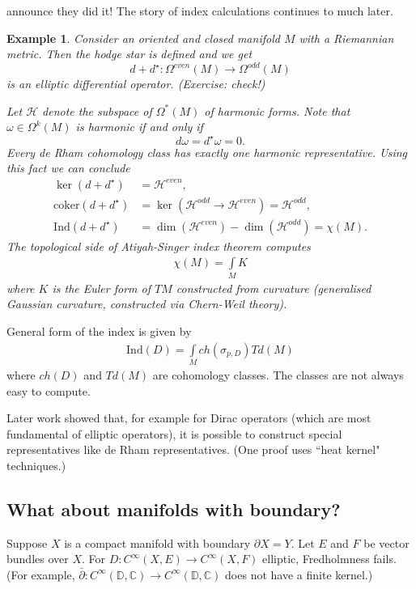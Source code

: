 \documentclass[11pt]{article}
\newcommand{\C}{\mathbb{C}}
\newcommand{\Ind}{\mathrm{Ind}}
\newcommand{\coker}{\mathrm{coker}}
\newtheorem{eg}[thm]{Example}
\begin{document}
 announce they did it! The story of index calculations continues to much later.

\begin{eg}
Consider an oriented and closed manifold $M$ with a Riemannian metric. Then the hodge star is defined and we get
$$ d + d^\star : \Omega^{even}(M) \to \Omega^{odd} (M)$$
is an elliptic differential operator. (Exercise: check!)

Let $\mathcal{H}$ denote the subspace of $\Omega^* (M)$ of harmonic forms. Note that $\omega \in \Omega^k(M)$ is harmonic if and only if $$d\omega = d^\star\omega = 0.$$
 Every de Rham cohomology class has exactly one harmonic representative. 
Using this fact we can conclude
\begin{align*}
\ker (d + d^\star) &= \mathcal{H}^{even},\\
\coker (d + d^\star ) &= \ker (\mathcal{H}^{odd} \to \mathcal{H}^{even}) = \mathcal{H}^{odd},\\
\Ind (d + d^\star) & = \dim (\mathcal{H}^{even}) - \dim (\mathcal{H}^{odd}) = \chi (M).
\end{align*}
The topological side of Atiyah-Singer index theorem computes
\begin{align*}
\chi(M) = \int\limits_M K
\end{align*}
where $K$ is the Euler form of $TM$ constructed from curvature (generalised Gaussian curvature, constructed via Chern-Weil theory).
\end{eg}

General form of the index is given by
\begin{align*}
\Ind (D) = \int\limits_M ch(\sigma_{p,D}) Td(M)
\end{align*}
where $ch(D)$ and $Td(M)$ are cohomology classes. The classes are not always easy to compute.

Later work showed that, for example for Dirac operators (which are most fundamental of elliptic operators), it is possible to construct special representatives like de Rham representatives. (One proof uses ``heat kernel" techniques.)

\subsection*{What about manifolds with boundary?}

Suppose $X$ is a compact manifold with boundary $\partial X = Y$. Let $E$ and $F$ be vector bundles over $X$. For $D: C^\infty (X,E) \to C^\infty (X, F)$ elliptic, Fredholmness fails. (For example, $\bar{\partial} : C^\infty(\mathbb{D}, \C) \to C^\infty(\mathbb{D}, \C)$ does not have a finite kernel.)
\end{document}
